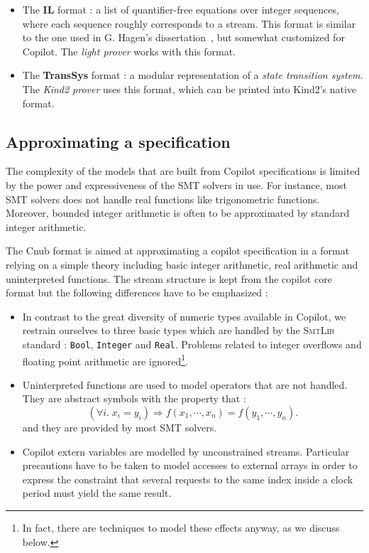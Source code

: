 \begin{itemize}
\item
  The \textbf{IL} format : a list
  of quantifier-free equations over integer sequences, where each sequence
  roughly corresponds to a stream.   This
format is similar to the one used in G.  Hagen's
dissertation~\cite{HagenPhD}, but somewhat customized for Copilot.   The \emph{light prover} works with this
  format.
\item The \textbf{TransSys} format : a modular representation of a
  \emph{state transition system}. The \emph{Kind2 prover} uses this
  format, which can be printed into Kind2's native format.
\end{itemize}

\subsection{Approximating a specification}


The complexity of the models that are built from Copilot specifications is limited by the power and expressiveness of the SMT solvers in use. For instance, most SMT solvers does not handle real functions like trigonometric functions. Moreover, bounded integer arithmetic is often to be approximated by standard integer arithmetic.

The {Cnub} format is aimed at approximating a copilot specification in a format relying on a simple theory including basic integer arithmetic, real arithmetic and uninterpreted functions. The stream structure is kept from the copilot core format but the following differences have to be emphasized :

\begin{itemize}
\item In contrast to the great diversity of numeric types available in Copilot, we restrain ourselves to three basic types which are handled by the \textsc{SmtLib} standard : \texttt{Bool}, \texttt{Integer} and \texttt{Real}. Problems related to integer overflows and floating point arithmetic are ignored\footnote{In fact, there are techniques to model these effects anyway, as we discuss below.}.


\item {Uninterpreted functions} are used to model operators that are not handled. They are abstract symbols with the property that : $$ \left( \forall i . \; x_i = y_i \right) \Longrightarrow f(x_1, \cdots, x_n) = f(y_1, \cdots, y_n). $$ and they are provided by most SMT solvers.

\item Copilot extern variables are modelled by unconstrained streams. Particular precautions have to be taken to model accesses to external arrays in order to express the constraint that several requests to the same index inside a clock period must yield the same result.

\end{itemize}

